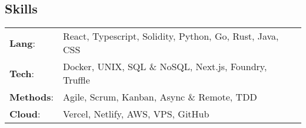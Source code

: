 \documentclass[line,margin]{res}
\begin{document}
\begin{resume}
	\section{Skills}
	\begin{tabular}{@{}ll}
		\textbf{Lang}:    & React, Typescript, Solidity, Python, Go, Rust, Java, CSS \\
		\textbf{Tech}:    & Docker, UNIX, SQL \& NoSQL, Next.js, Foundry, Truffle    \\
		\textbf{Methods}: & Agile, Scrum, Kanban, Async \& Remote, TDD               \\
		\textbf{Cloud}:   & Vercel, Netlify, AWS, VPS, GitHub                        \\
	\end{tabular}
	
	
	\ 
\end{resume}
\end{document}
